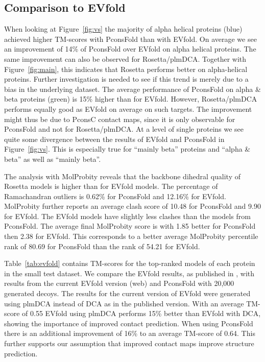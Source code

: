 \documentclass{bioinfo}
\begin{document}
\subsection{Comparison to EVfold}

When looking at Figure~\ref{fig:vs} the majority of alpha helical
proteins (blue) achieved higher TM-scores with PconsFold than with
EVfold. On average we see an improvement of 14\% of PconsFold over
EVfold on alpha helical proteins. The same improvement can also be
observed for Rosetta/plmDCA. Together with Figure~\ref{fig:main},
this indicates that Rosetta performs better on alpha-helical
proteins. Further investigation is needed to see if this trend is
merely due to a bias in the underlying dataset. The average
performance of PconsFold on alpha \& beta proteins (green) is 15\%
higher than for EVfold. However, Rosetta/plmDCA performs equally good
as EVfold on average on such targets. The improvement might thus be
due to PconsC contact maps, since it is only observable for PconsFold
and not for Rosetta/plmDCA. At a level of single proteins we see quite
some divergence between the results of EVfold and PconsFold in
Figure~\ref{fig:vs}. This is especially true for ``mainly beta''
proteins and ``alpha \& beta'' as well as ``mainly beta''.

The analysis with MolProbity reveals that the backbone dihedral
quality of Rosetta models is higher than for EVfold models. The
percentage of Ramachandran outliers is 0.62\% for PconsFold and 12.16\% for EVfold. MolProbity further reports an average clash score of
10.48 for PconsFold and 9.90 for EVfold. The EVfold models have
slightly less clashes than the models from PconsFold. The average
final MolProbity score is with 1.85 better for PconsFold then 2.38 for
EVfold. This corresponds to a better average MolProbity percentile
rank of 80.69 for PconsFold than the rank of 54.21 for EVfold.


Table~\ref{tab:evfold} contains TM-scores for the top-ranked models of
each protein in the small test dataset. We compare the EVfold results,
as published in \citeauthor{marks_protein_2011}
\citeyear{marks_protein_2011}, with results from the current EVfold
version (web) and PconsFold with 20,000 generated decoys. The results
for the current version of EVfold were generated using plmDCA instead
of DCA as in the published version. With an average TM-score of 0.55
EVfold using plmDCA performs 15\% better than EVfold with DCA,
showing the importance of improved contact prediction. When using
PconsFold there is an additional improvement of 16\% to an average
TM-score of 0.64. This further supports our assumption that improved
contact maps improve structure prediction.
\end{document}
